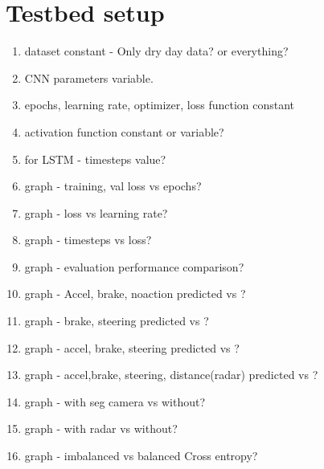 \section{Testbed setup}

\begin{enumerate}
    \item dataset constant - Only dry day data?
        or everything?
    \item CNN parameters variable.
    \item epochs, learning rate, optimizer, loss function constant
    \item activation function constant or variable?
    \item for LSTM - timesteps value?
    \item graph - training, val loss vs epochs?
    \item graph - loss vs learning rate?
    \item graph - timesteps vs loss?
    \item graph - evaluation performance comparison?
    \item graph - Accel, brake, noaction predicted vs ?
    \item graph - brake, steering predicted vs ?
    \item graph - accel, brake, steering predicted vs ?
    \item graph - accel,brake, steering, distance(radar) predicted vs ?
    \item graph - with seg camera vs without?
    \item graph - with radar vs without?
    \item graph - imbalanced vs balanced Cross entropy?

\end{enumerate}
\fi

